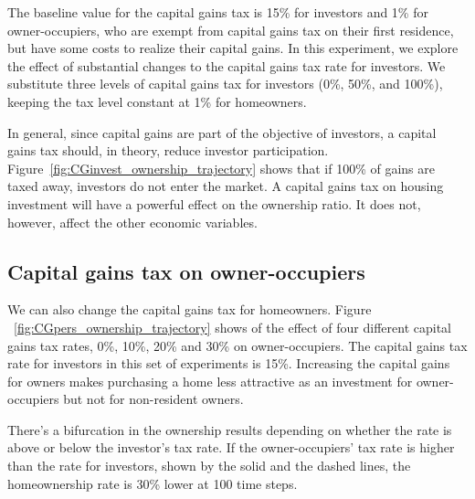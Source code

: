 The baseline value for the capital gains tax is 15\% for investors and 1\% for owner-occupiers, who are exempt from capital gains tax on their first residence, but have some costs to realize their capital gains. In this experiment, we explore the effect of substantial changes to the capital gains tax rate for investors. 
We substitute three levels of capital gains tax for investors (0\%, 50\%, and 100\%), keeping the tax level constant at 1\% for homeowners.

In general, since capital gains are part of the objective of investors, a capital gains tax should, in theory, reduce investor participation. Figure~\ref{fig:CGinvest_ownership_trajectory} shows that if 100\% of gains are taxed away, investors do not enter the market. A capital gains tax on housing investment will have a powerful effect on the ownership ratio. It does not, however, affect the other economic variables. %

\newpage
\subsection{Capital gains tax on owner-occupiers}
We can also change the capital gains tax for homeowners. 
Figure ~\ref{fig:CGpers_ownership_trajectory} shows of the effect of four different capital gains tax rates, 0\%, 10\%, 20\% and 30\% on owner-occupiers. The capital gains tax rate for investors in this set of experiments is 15\%. Increasing the capital gains for owners makes purchasing a home less attractive as an investment for owner-occupiers but not for non-resident owners. %


There's a bifurcation in the ownership results depending on whether the rate is above or below the investor's tax rate.  If the owner-occupiers' tax rate is higher than the rate for investors,  shown by the solid and the dashed lines,  the homeownership rate is  30\% lower at 100 time steps. 


